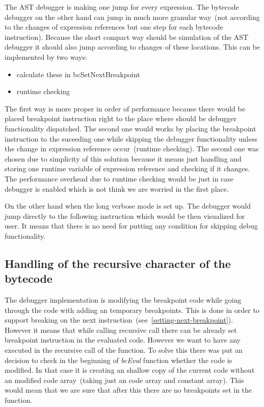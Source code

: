 \documentclass[thesis=M,english]{FITthesis}[2018/10/20]
\begin{document}
The AST debugger is making one jump for every expression. The bytecode debugger on the other hand can jump in much more granular way~(not according to the changes of expression references but one step for each bytecode instruction). Because the short compact way should be simulation of the AST debugger it should also jump according to changes of these locations. This can be implemented by two ways:

\begin{itemize}
	\item calculate these in bcSetNextBreakpoint
	\item runtime checking
\end{itemize}

The first way is more proper in order of performance because there would be placed breakpoint instruction right to the place where should be debugger functionality dispatched. The second one would works by placing the breakpoint instruction to the suceeding one while skipping the debugger functionality unless the change in expression reference occur~(runtime checking). The second one was chosen due to simplicity of this solution because it means just handling and storing one runtime variable of expression reference and checking if it changes. The performance overhead due to runtime checking would be just in case debugger is enabled which is not think we are worried in the first place.

On the other hand when the long verbose mode is set up. The debugger would jump directly to the following instruction which would be then visualized for user. It means that there is no need for putting any condition for skipping debug functionality.

\subsection{Handling of the recursive character of the bytecode}

The debugger implementation is modifying the breakpoint code  while going through the code with adding an temporary breakpoints. This is done in order to support breaking on the next instruction~(see~\ref{setting-next-breakpoint}). However it means that while calling recursive call there can be already set breakpoint instruction in the evaluated code. However we want to have any executed in the recursive call of the function. To solve this there was put an decision to check in the beginning of \textit{bcEval} function whether the code is modified. In that case it is creating an shallow copy of the current code without an modified code array~(taking just an code array and constant array). This would mean that we are sure that after this there are no breakpoints set in the function.
\end{document}

